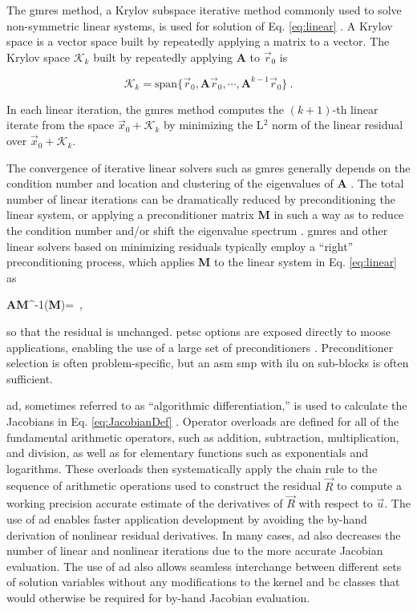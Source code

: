 \noindent The \gls{gmres} method, a Krylov subspace iterative method commonly used to solve non-symmetric linear systems, is used for solution of Eq. \eqref{eq:linear} \cite{saad}. A Krylov space is a vector space built by repeatedly applying a matrix to a vector. The Krylov space \(\mathcal{K}_k\) built by repeatedly applying \(\textbf{A}\) to \(\vec{r}_0\) is

\begin{equation}
\label{eq:krylov_space}
\mathcal{K}_k=\textrm{span}\{\vec{r}_0, \textbf{A}\vec{r}_0, \cdots, \textbf{A}^{k-1}\vec{r}_0\}\ .
\end{equation}

\noindent In each linear iteration, the \gls{gmres} method computes the \((k+1)\)-th linear iterate from the space \(\vec{x}_0+\mathcal{K}_k\) by minimizing the L$^2$ norm of the linear residual over \(\vec{x}_0+\mathcal{K}_k\). 

The convergence of iterative linear solvers such as \gls{gmres} generally depends on the condition number and location and clustering of the eigenvalues of \textbf{A} \cite{trefethen}. The total number of linear iterations can be dramatically reduced by preconditioning the linear system, or applying a preconditioner matrix \textbf{M} in such a way as to reduce the condition number and/or shift the eigenvalue spectrum \cite{benzi}. \gls{gmres} and other linear solvers based on minimizing residuals typically employ a ``right'' preconditioning process, which applies \textbf{M} to the linear system in Eq. \eqref{eq:linear} as

\beq
\textbf{A}\textbf{M}^{-1}(\textbf{M})=\ ,
\eeq

\noindent so that the residual is unchanged. \gls{petsc} options are exposed directly to \gls{moose} applications, enabling the use of a large set of preconditioners \cite{petsc}. Preconditioner selection is often problem-specific, but an \gls{asm} \gls{smp} with \gls{ilu} on sub-blocks is often sufficient.

\gls{ad}, sometimes referred to as ``algorithmic differentiation,'' is used to calculate the Jacobians in Eq. \eqref{eq:JacobianDef} \cite{ad}. Operator overloads are defined for all of the fundamental arithmetic operators, such as addition, subtraction, multiplication, and division, as well as for elementary functions such as exponentials and logarithms. These overloads then systematically apply the chain rule to the sequence of arithmetic operations used to construct the residual \(\vec{R}\) to compute a working precision accurate estimate of the derivatives of \(\vec{R}\) with respect to \(\vec{u}\). The use of \gls{ad} enables faster application development by avoiding the by-hand derivation of nonlinear residual derivatives. In many cases, \gls{ad} also decreases the number of linear and nonlinear iterations due to the more accurate Jacobian evaluation. The use of \gls{ad} also allows seamless interchange between different sets of solution variables without any modifications to the kernel and \gls{bc} classes that would otherwise be required for by-hand Jacobian evaluation.

